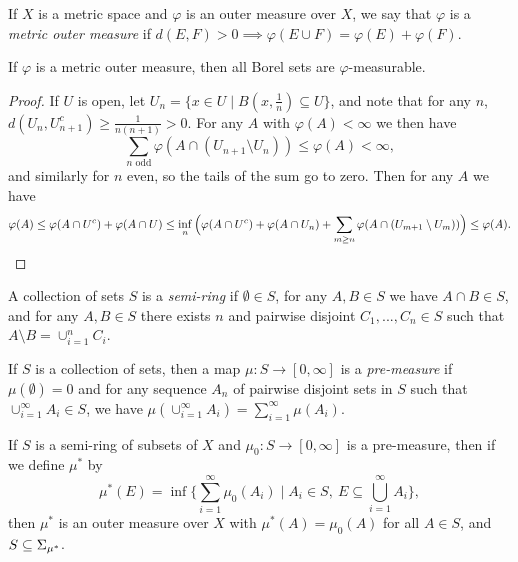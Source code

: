 \documentclass[letterpaper,11pt]{report}
\begin{document}
\begin{defn} If $X$ is a metric space and $\varphi$ is an outer measure over $X$, we say that $\varphi$ is a \emph{metric outer measure} if $d(E,F) > 0 \implies \varphi(E \cup F) = \varphi(E) + \varphi(F)$.
\end{defn}

\begin{thm} If $\varphi$ is a metric outer measure, then all Borel sets are $\varphi$-measurable.
\end{thm}
\begin{proof} If $U$ is open, let $U_n = \{x \in U \mid B(x,\frac{1}{n}) \subseteq U\}$, and note that for any $n$, $d(U_n, U_{n+1}^c) \ge \frac{1}{n(n+1)} > 0$. For any $A$ with $\varphi(A) < \infty$ we then have
\[
\sum_{n\text{ odd}} \varphi(A \cap (U_{n+1}\setminus U_n)) \le \varphi(A) < \infty,
\]
and similarly for $n$ even, so the tails of the sum go to zero. Then for any $A$ we have
\[
\varphi(A) \le \varphi(A \cap U^c) + \varphi(A \cap U) \le \inf_n \Big(\varphi(A\cap U^c) + \varphi(A\cap U_n) + \sum_{m \ge n} \varphi(A\cap (U_{m+1}\setminus U_m))\Big) \le \varphi(A).\qedhere
\]
\end{proof}

\begin{defn} A collection of sets $S$ is a \emph{semi-ring} if $\emptyset \in S$, for any $A,B \in S$ we have $A \cap B \in S$, and for any $A, B \in S$ there exists $n$ and pairwise disjoint $C_1, ..., C_n \in S$ such that $A \setminus B = \cup_{i=1}^n C_i$.
\end{defn}

\begin{defn} If $S$ is a collection of sets, then a map $\mu : S \rightarrow [0,\infty]$ is a \emph{pre-measure} if $\mu(\emptyset) = 0$ and for any sequence $A_n$ of pairwise disjoint sets in $S$ such that $\cup_{i=1}^\infty A_i \in S$, we have $\mu(\cup_{i=1}^\infty A_i) = \sum_{i=1}^\infty \mu(A_i)$.
\end{defn}

\begin{thm}\label{caratheodory-extension} If $S$ is a semi-ring of subsets of $X$ and $\mu_0 : S \rightarrow [0,\infty]$ is a pre-measure, then if we define $\mu^*$ by
\[
\mu^*(E) = \inf \Big\{\sum_{i=1}^\infty \mu_0(A_i) \mid A_i \in S,\ E \subseteq \bigcup_{i=1}^\infty A_i\Big\},
\]
then $\mu^*$ is an outer measure over $X$ with $\mu^*(A) = \mu_0(A)$ for all $A\in S$, and $S \subseteq \Sigma_{\mu^*}$.
\end{thm}
\end{document}
